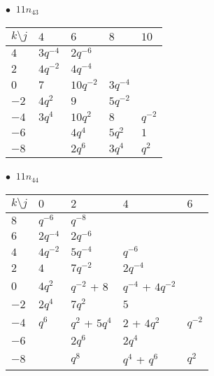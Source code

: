 %
\begin{minipage}{\linewidth}
$\bullet\ $ $11n_{43}$ \vspace{0.5em} \\
\begin{tabular}{l|llll}
$k \setminus j$ & $4$ & $6$ & $8$ & $10$ \\
\hline
$4$ & $3q^{-4}$ & $2q^{-6}$ &  &  \\
$2$ & $4q^{-2}$ & $4q^{-4}$ &  &  \\
$0$ & $7$ & $10q^{-2}$ & $3q^{-4}$ &  \\
$-2$ & $4q^{2}$ & $9$ & $5q^{-2}$ &  \\
$-4$ & $3q^{4}$ & $10q^{2}$ & $8$ & $q^{-2}$ \\
$-6$ &  & $4q^{4}$ & $5q^{2}$ & $1$ \\
$-8$ &  & $2q^{6}$ & $3q^{4}$ & $q^{2}$ \\
\end{tabular}
\vspace{2em}
\end{minipage}
%
\begin{minipage}{\linewidth}
$\bullet\ $ $11n_{44}$ \vspace{0.5em} \\
\begin{tabular}{l|llll}
$k \setminus j$ & $0$ & $2$ & $4$ & $6$ \\
\hline
$8$ & $q^{-6}$ & $q^{-8}$ &  &  \\
$6$ & $2q^{-4}$ & $2q^{-6}$ &  &  \\
$4$ & $4q^{-2}$ & $5q^{-4}$ & $q^{-6}$ &  \\
$2$ & $4$ & $7q^{-2}$ & $2q^{-4}$ &  \\
$0$ & $4q^{2}$ & $q^{-2}$ + $8$ & $q^{-4}$ + $4q^{-2}$ &  \\
$-2$ & $2q^{4}$ & $7q^{2}$ & $5$ &  \\
$-4$ & $q^{6}$ & $q^{2}$ + $5q^{4}$ & $2$ + $4q^{2}$ & $q^{-2}$ \\
$-6$ &  & $2q^{6}$ & $2q^{4}$ &  \\
$-8$ &  & $q^{8}$ & $q^{4}$ + $q^{6}$ & $q^{2}$ \\
\end{tabular}
\vspace{2em}
\end{minipage}
%

